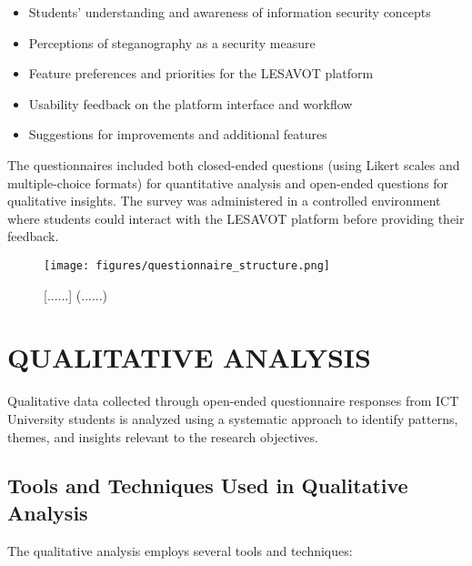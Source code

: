 \documentclass[12pt, a4paper, oneside]{book}
\begin{document}
\begin{itemize}[leftmargin=*]
    \item Students' understanding and awareness of information security concepts
    \item Perceptions of steganography as a security measure
    \item Feature preferences and priorities for the LESAVOT platform
    \item Usability feedback on the platform interface and workflow
    \item Suggestions for improvements and additional features
\end{itemize}

The questionnaires included both closed-ended questions (using Likert scales and multiple-choice formats) for quantitative analysis and open-ended questions for qualitative insights. The survey was administered in a controlled environment where students could interact with the LESAVOT platform before providing their feedback.

\begin{figure}[htbp]
    \centering
    \texttt{[image: figures/questionnaire\_structure.png]}
    \caption{[......] (......)}
    \label{fig:questionnaire_structure}
\end{figure}



\section{QUALITATIVE ANALYSIS}

Qualitative data collected through open-ended questionnaire responses from ICT University students is analyzed using a systematic approach to identify patterns, themes, and insights relevant to the research objectives.

\subsection{Tools and Techniques Used in Qualitative Analysis}
The qualitative analysis employs several tools and techniques:
\end{document}

